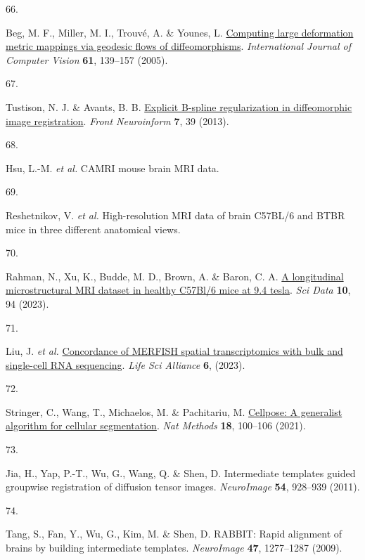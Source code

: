 \documentclass[
  12pt,
]{article}
\newlength{\cslhangindent}
\newlength{\csllabelwidth}
\newenvironment{CSLReferences}[2] %
 {\begin{list}{}{%
  \setlength{\itemindent}{0pt}
  \setlength{\leftmargin}{0pt}
  \setlength{\parsep}{0pt}
  \ifodd #1
   \setlength{\leftmargin}{\cslhangindent}
   \setlength{\itemindent}{-1\cslhangindent}
  \fi
  \setlength{\itemsep}{#2\baselineskip}}}
 {\end{list}}
\newcommand{\CSLLeftMargin}[1]{\parbox[t]{\csllabelwidth}{\strut#1\strut}}
\newcommand{\CSLRightInline}[1]{\parbox[t]{\linewidth - \csllabelwidth}{\strut#1\strut}}
\begin{document}
\begin{CSLReferences}{0}{0}
\CSLLeftMargin{66. }%
\CSLRightInline{Beg, M. F., Miller, M. I., Trouvé, A. \& Younes, L.
\href{https://doi.org/10.1023/B:VISI.0000043755.93987.aa}{Computing
large deformation metric mappings via geodesic flows of
diffeomorphisms}. \emph{International Journal of Computer Vision}
\textbf{61}, 139--157 (2005).}

\CSLLeftMargin{67. }%
\CSLRightInline{Tustison, N. J. \& Avants, B. B.
\href{https://doi.org/10.3389/fninf.2013.00039}{Explicit {B}-spline
regularization in diffeomorphic image registration}. \emph{Front
Neuroinform} \textbf{7}, 39 (2013).}

\CSLLeftMargin{68. }%
\CSLRightInline{Hsu, L.-M. \emph{et al.} CAMRI mouse brain MRI data.}

\CSLLeftMargin{69. }%
\CSLRightInline{Reshetnikov, V. \emph{et al.} High-resolution MRI data
of brain C57BL/6 and BTBR mice in three different anatomical views.}

\CSLLeftMargin{70. }%
\CSLRightInline{Rahman, N., Xu, K., Budde, M. D., Brown, A. \& Baron, C.
A. \href{https://doi.org/10.1038/s41597-023-01942-5}{A longitudinal
microstructural MRI dataset in healthy C57Bl/6 mice at 9.4 tesla}.
\emph{Sci Data} \textbf{10}, 94 (2023).}

\CSLLeftMargin{71. }%
\CSLRightInline{Liu, J. \emph{et al.}
\href{https://doi.org/10.26508/lsa.202201701}{Concordance of MERFISH
spatial transcriptomics with bulk and single-cell RNA sequencing}.
\emph{Life Sci Alliance} \textbf{6}, (2023).}

\CSLLeftMargin{72. }%
\CSLRightInline{Stringer, C., Wang, T., Michaelos, M. \& Pachitariu, M.
\href{https://doi.org/10.1038/s41592-020-01018-x}{Cellpose: A generalist
algorithm for cellular segmentation}. \emph{Nat Methods} \textbf{18},
100--106 (2021).}

\CSLLeftMargin{73. }%
\CSLRightInline{Jia, H., Yap, P.-T., Wu, G., Wang, Q. \& Shen, D.
Intermediate templates guided groupwise registration of diffusion tensor
images. \emph{NeuroImage} \textbf{54}, 928--939 (2011).}

\CSLLeftMargin{74. }%
\CSLRightInline{Tang, S., Fan, Y., Wu, G., Kim, M. \& Shen, D. RABBIT:
Rapid alignment of brains by building intermediate templates.
\emph{NeuroImage} \textbf{47}, 1277--1287 (2009).}


\end{CSLReferences}
\end{document}
